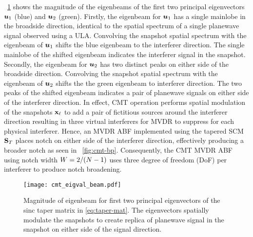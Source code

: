 \figurename{}~\ref{fig:cmt-eigenbeam} shows the magnitude of the
eigenbeams of the first two principal eigenvectors $\boldsymbol{u}_1$
(blue) and $\boldsymbol{u}_2$ (green). Firstly, the eigenbeam for
$\boldsymbol{u}_1$ has a single mainlobe in the broadside direction,
identical to the spatial spectrum of a single planewave signal
observed using a ULA. Convolving the snapshot spatial spectrum with
the eigenbeam of $\boldsymbol{u}_1$ shifts the blue eigenbeam to the
interferer direction. The single mainlobe of the shifted eigenbeam
indicates the interferer signal in the snapshot. Secondly, the
eigenbeam for $\boldsymbol{u}_2$ has two distinct peaks on either side of
the broadside direction. Convolving the snapshot spatial spectrum with
the eigenbeam of $\boldsymbol{u}_2$ shifts the the green eigenbeam to
interferer direction. The two peaks of the shifted eigenbeam indicates
a pair of planewave signals on either side of the interferer
direction. In effect, CMT operation performs spatial modulation of the
snapshots ${\bf x}_{\ell}$ to add a pair of fictitious sources around
the interferer direction resulting in three virtual interferers for
MVDR to suppress for each physical interferer. Hence, an MVDR ABF
implemented using the tapered SCM ${\bf S}_{T}$ places notch on
either side of the interferer direction, effectively producing a
broader notch as seen in \figurename{}~\ref{fig:cmt-bp}. Consequently,
the CMT MVDR ABF using notch width $W = 2/(N-1)$ uses three degree
of freedom (DoF) per interferer to produce notch broadening.

\begin{figure}[!htb]
  \centering
  \texttt{[image: cmt\_eigval\_beam.pdf]}
  \caption[Magnitude of eigenbeam for first two principal eigenvectors
  of the sinc taper matrix in \eqn{}\eqref{eq:taper-mat}.]{Magnitude
    of eigenbeam for first two principal eigenvectors of the sinc
    taper matrix in \eqn{}\eqref{eq:taper-mat}. The eigenvectors
    spatially modulate the snapshots to create replica of planewave
    signal in the snapshot on either side of the signal direction.}
  \label{fig:cmt-eigenbeam}
\end{figure}

